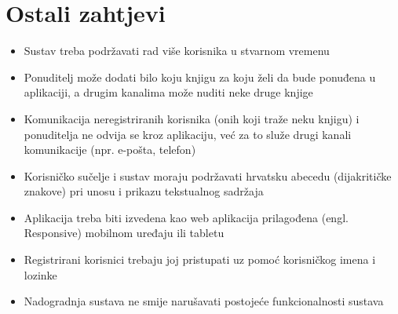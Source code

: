 \eject	

\section{Ostali zahtjevi}
\begin{itemize}
	\item Sustav treba podržavati rad više korisnika u stvarnom vremenu
	\item Ponuditelj može dodati bilo koju knjigu za koju želi da bude ponuđena u aplikaciji, a drugim kanalima može nuditi neke druge knjige
	\item Komunikacija neregistriranih korisnika (onih koji traže neku knjigu) i ponuditelja ne odvija se kroz aplikaciju, već za to služe drugi kanali komunikacije (npr. e-pošta, telefon)
	\item Korisničko sučelje i sustav moraju podržavati hrvatsku abecedu (dijakritičke znakove) pri unosu i prikazu tekstualnog sadržaja
	\item Aplikacija treba biti izvedena kao web aplikacija prilagođena (engl. Responsive) mobilnom uređaju ili tabletu
	\item Registrirani korisnici trebaju joj pristupati uz pomoć korisničkog imena i lozinke
	\item Nadogradnja sustava ne smije narušavati postojeće funkcionalnosti sustava
\end{itemize}
